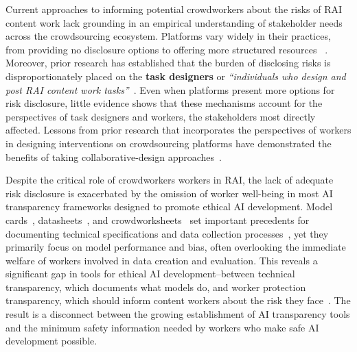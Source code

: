 Current approaches to informing potential crowdworkers about the risks of RAI content work lack grounding in an empirical understanding of stakeholder needs across the crowdsourcing ecosystem. Platforms vary widely in their practices, from providing no disclosure options to offering more structured resources ~\cite{prolific2025participant, prolific2025sensitive, ProlificAPIContentWarning2025}. Moreover, prior research has established that the burden of disclosing risks is disproportionately placed on the \textbf{task designers} or \textit{``individuals who design and post RAI content work tasks''}~\cite{qian2025locating}. Even when platforms present more options for risk disclosure, little evidence shows that these mechanisms account for the perspectives of task designers and workers, the stakeholders most directly affected. Lessons from prior research that incorporates the perspectives of workers in designing interventions on crowdsourcing platforms have demonstrated the benefits of taking collaborative-design approaches~\cite{irani2016stories, mturk2018aup, silberman2018responsible}.

Despite the critical role of crowdworkers workers in RAI, the lack of adequate risk disclosure is exacerbated by the omission of worker well-being in most AI transparency frameworks designed to promote ethical AI development. Model cards~\cite{mitchell2019model}, datasheets~\cite{gebru2021datasheets}, and crowdworksheets~\cite{diaz2022crowdworksheets} set important precedents for documenting technical specifications and data collection processes~\cite{gebru2021datasheets, diaz2022crowdworksheets, mitchell2019model}, yet they primarily focus on model performance and bias, often overlooking the immediate welfare of workers involved in data creation and evaluation. This reveals a significant gap in tools for ethical AI development--between technical transparency, which documents what models do, and worker protection transparency, which should inform content workers about the risk they face~\cite{bharucha2023content}. The result is a disconnect between the growing establishment of AI transparency tools and the minimum safety information needed by workers who make safe AI development possible. 

